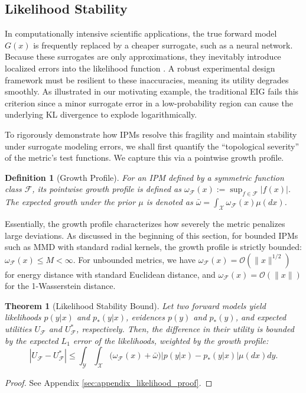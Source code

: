 \documentclass[twoside,11pt]{article}
\newtheorem{thm}{Theorem}[section]
\newtheorem{defn}{Definition}[section]
\def\gF{{\mathcal{F}}}
\begin{document}
\subsection{Likelihood Stability}
\label{sec:likelihood_stability}
In computationally intensive scientific applications, the true forward model $G(x)$ is frequently replaced by a cheaper surrogate, such as a neural network. Because these surrogates are only approximations, they inevitably introduce localized errors into the likelihood function \citep{liu2023review}. A robust experimental design framework must be resilient to these inaccuracies, meaning its utility degrades smoothly. As illustrated in our motivating example, the traditional EIG fails this criterion since a minor surrogate error in a low-probability region can cause the underlying KL divergence to explode logarithmically.

To rigorously demonstrate how IPMs resolve this fragility and maintain stability under surrogate modeling errors, we shall first quantify the ``topological severity'' of the metric's test functions. We capture this via a pointwise growth profile.

\begin{defn}[Growth Profile]
    For an IPM defined by a symmetric function class $\mathcal{F}$,  its pointwise growth profile is defined as $\omega_{\mathcal{F}}(x) := \sup_{f \in \mathcal{F}} |f(x)|$. The expected growth under the prior $\mu$ is denoted as $\bar{\omega} = \int_{\mathcal{X}} \omega_{\mathcal{F}}(x)\mu(dx)$. 
\end{defn}

Essentially, the growth profile characterizes how severely the metric penalizes large deviations. As discussed in the beginning of this section, for bounded IPMs such as MMD with standard radial kernels, the growth profile is strictly bounded: $\omega_{\mathcal{F}}(x) \le M < \infty$. For unbounded metrics, we have $\omega_{\mathcal{F}}(x) = \mathcal{O}(\|x\|^{1/2})$ for energy distance with standard Euclidean distance, and $\omega_{\mathcal{F}}(x) = \mathcal{O}(\|x\|)$ for the 1-Wasserstein distance.

\begin{thm}[Likelihood Stability Bound] \label{thm:likelihood}
Let two forward models yield likelihoods $p(y|x)$ and $p_*(y|x)$, evidences $p(y)$ and $p_*(y)$, and expected utilities $U_{\gF}$ and $U_{\gF}^*$, respectively. Then, the difference in their utility is bounded by the expected $L_1$ error of the likelihoods, weighted by the growth profile:
$$|U_{\mathcal{F}} - U_{\mathcal{F}}^*| \le \int_{\mathcal{Y}} \int_{\mathcal{X}} \Big( \omega_{\mathcal{F}}(x) + \bar{\omega} \Big) \Big| p(y|x) - p_*(y|x) \Big| \mu(dx) dy.$$
\end{thm}
\begin{proof}
    See Appendix \ref{sec:appendix_likelihood_proof}.
\end{proof}
\end{document}
